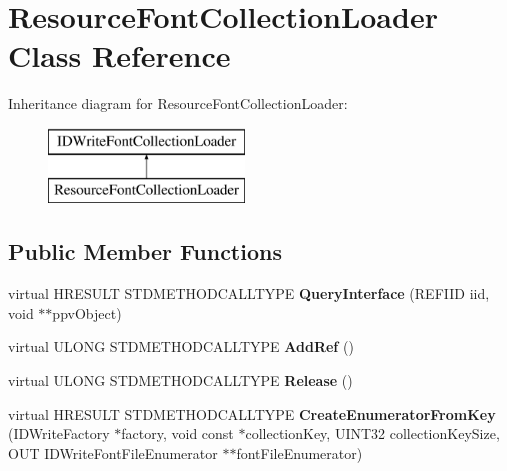 \hypertarget{class_resource_font_collection_loader}{\section{Resource\-Font\-Collection\-Loader Class Reference}
\label{class_resource_font_collection_loader}
}
Inheritance diagram for Resource\-Font\-Collection\-Loader\-:\begin{figure}[H]
\begin{center}
\leavevmode
\includegraphics[height=2.000000cm]{class_resource_font_collection_loader}
\end{center}
\end{figure}
\subsection*{Public Member Functions}
\begin{DoxyCompactItemize}
\item 
\hypertarget{class_resource_font_collection_loader_aeb076e9f9989e7bb75e711c321d73a68}{virtual H\-R\-E\-S\-U\-L\-T S\-T\-D\-M\-E\-T\-H\-O\-D\-C\-A\-L\-L\-T\-Y\-P\-E {\bfseries Query\-Interface} (R\-E\-F\-I\-I\-D iid, void $\ast$$\ast$ppv\-Object)}\label{class_resource_font_collection_loader_aeb076e9f9989e7bb75e711c321d73a68}

\item 
\hypertarget{class_resource_font_collection_loader_a2f4562450d74fd66c6d2c529b64b15bd}{virtual U\-L\-O\-N\-G S\-T\-D\-M\-E\-T\-H\-O\-D\-C\-A\-L\-L\-T\-Y\-P\-E {\bfseries Add\-Ref} ()}\label{class_resource_font_collection_loader_a2f4562450d74fd66c6d2c529b64b15bd}

\item 
\hypertarget{class_resource_font_collection_loader_aa5e7a778176b856dc22ea0cd34336818}{virtual U\-L\-O\-N\-G S\-T\-D\-M\-E\-T\-H\-O\-D\-C\-A\-L\-L\-T\-Y\-P\-E {\bfseries Release} ()}\label{class_resource_font_collection_loader_aa5e7a778176b856dc22ea0cd34336818}

\item 
\hypertarget{class_resource_font_collection_loader_a10cf52a851165e73c115a343a3fff727}{virtual H\-R\-E\-S\-U\-L\-T S\-T\-D\-M\-E\-T\-H\-O\-D\-C\-A\-L\-L\-T\-Y\-P\-E {\bfseries Create\-Enumerator\-From\-Key} (I\-D\-Write\-Factory $\ast$factory, void const $\ast$collection\-Key, U\-I\-N\-T32 collection\-Key\-Size, O\-U\-T I\-D\-Write\-Font\-File\-Enumerator $\ast$$\ast$font\-File\-Enumerator)}\label{class_resource_font_collection_loader_a10cf52a851165e73c115a343a3fff727}

\end{DoxyCompactItemize}

